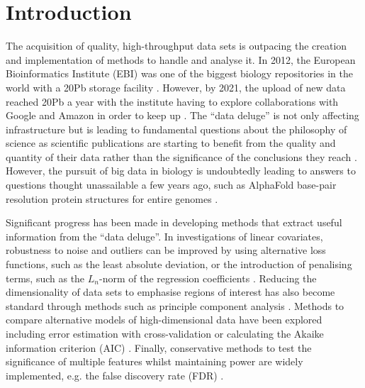 \documentclass[../main.tex]{subfiles}
\begin{document}
\chapter{{Introduction}}

The acquisition of quality, high-throughput data sets is outpacing the creation and implementation of methods to handle and analyse it. 
In 2012, the European Bioinformatics Institute (EBI) was one of the biggest biology repositories in the world with a 20Pb storage facility \parencite{EBI2012}. 
However, by 2021, the upload of new data reached 20Pb a year with the institute having to explore collaborations with Google and Amazon in order to keep up \parencite{EBI2021}. 
The “data deluge” \parencite{Royal2012} is not only affecting infrastructure but is leading to fundamental questions about the philosophy of science as scientific publications are starting to benefit from the quality and quantity of their data rather than the significance of the conclusions they reach \parencite{Leonelli2019, Botstein2010}. 
However, the pursuit of big data in biology is undoubtedly leading to answers to questions thought unassailable a few years ago, such as AlphaFold base-pair resolution protein structures for entire genomes \parencite{Jumper2021}. 

Significant progress has been made in developing methods that extract useful information from the “data deluge”.
In investigations of linear covariates, robustness to noise and outliers can be improved by using alternative loss functions, such as the least absolute deviation, or the introduction of penalising terms, such as the $L_n$-norm of the regression coefficients \parencite{Wu2015}.
Reducing the dimensionality of data sets to emphasise regions of interest has also become standard through methods such as principle component analysis \parencite{Wall2005}.  
Methods to compare alternative models of high-dimensional data have been explored including error estimation with cross-validation \parencite{Molinaro2005} or calculating the Akaike information criterion (AIC) \parencite{Akaike1998}.
Finally, conservative methods to test the significance of multiple features whilst maintaining power are widely implemented, e.g. the false discovery rate (FDR) \parencite{Benjamini1995}.
\end{document}
